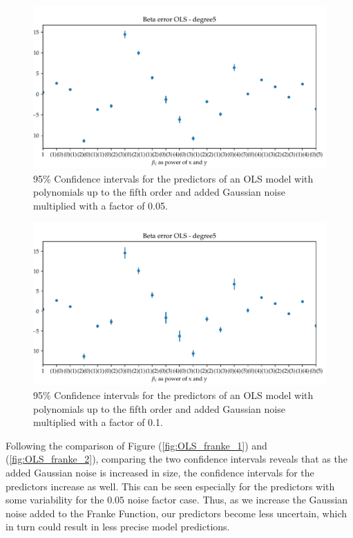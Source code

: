 \documentclass[11pt, a4paper]{article}
\begin{document}
\begin{figure}
  \centering
  \includegraphics[scale=.85]{figures/EX1_OLS_beta_error_degree5.pdf}
  \caption{\label{fig:OLS_beta_1} 95\% Confidence intervals for the predictors of an OLS model with polynomials up to the fifth order and added Gaussian noise multiplied with a factor of 0.05.}
\end{figure}

\begin{figure}
  \centering
  \includegraphics[scale=.85]{figures/EX1_OLS_beta_error_degree5_dn.pdf}
  \caption{\label{fig:OLS_beta_2} 95\% Confidence intervals for the predictors of an OLS model with polynomials up to the fifth order and added Gaussian noise multiplied with a factor of 0.1.}
\end{figure}

Following the comparison of Figure (\ref{fig:OLS_franke_1}) and (\ref{fig:OLS_franke_2}), comparing the two confidence intervals reveals that as the added Gaussian noise is increased in size, the confidence intervals for the predictors increase as well. This can be seen especially for the predictors with some variability for the $0.05$ noise factor case. Thus, as we increase the Gaussian noise added to the Franke Function, our predictors become less uncertain, which in turn could result in less precise model predictions. 
\end{document}
